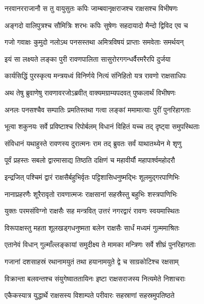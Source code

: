 
\twolineshloka
{नरवानरराजानौ स तु वायुसुतः कपिः}
{जाम्बवानृक्षराजश्च राक्षसश्च विभीषणः} %

\twolineshloka
{अङ्गदो वालिपुत्रश्च सौमित्रिः शरभः कपिः}
{सुषेणः सहदायादो मैन्दो द्विविद एव च} %

\twolineshloka
{गजो गवाक्षः कुमुदो नलोऽथ पनसस्तथा}
{अमित्रविषयं प्राप्ताः समवेताः समर्थयन्} %

\twolineshloka
{इयं सा लक्ष्यते लङ्का पुरी रावणपालिता}
{सासुरोरगगन्धर्वैरमरैरपि दुर्जया} %

\twolineshloka
{कार्यसिद्धिं पुरस्कृत्य मन्त्रयध्वं विनिर्णये}
{नित्यं संनिहितो यत्र रावणो राक्षसाधिपः} %

\twolineshloka
{अथ तेषु ब्रुवाणेषु रावणावरजोऽब्रवीत्}
{वाक्यमग्राम्यपदवत् पुष्कलार्थं विभीषणः} %

\twolineshloka
{अनलः पनसश्चैव सम्पातिः प्रमतिस्तथा}
{गत्वा लङ्कां ममामात्याः पुरीं पुनरिहागताः} %

\twolineshloka
{भूत्वा शकुनयः सर्वे प्रविष्टाश्च रिपोर्बलम्}
{विधानं विहितं यच्च तद् दृष्ट्वा समुपस्थिताः} %

\twolineshloka
{संविधानं यथाहुस्ते रावणस्य दुरात्मनः}
{राम तद् ब्रुवतः सर्वं याथातथ्येन मे शृणु} %

\twolineshloka
{पूर्वं प्रहस्तः सबलो द्वारमासाद्य तिष्ठति}
{दक्षिणं च महावीर्यौ महापार्श्वमहोदरौ} %

\twolineshloka
{इन्द्रजित् पश्चिमं द्वारं राक्षसैर्बहुभिर्वृतः}
{पट्टिशासिधनुष्मद्भिः शूलमुद्गरपाणिभिः} %

\twolineshloka
{नानाप्रहरणैः शूरैरावृतो रावणात्मजः}
{राक्षसानां सहस्रैस्तु बहुभिः शस्त्रपाणिभिः} %

\twolineshloka
{युक्तः परमसंविग्नो राक्षसैः सह मन्त्रवित्}
{उत्तरं नगरद्वारं रावणः स्वयमास्थितः} %

\twolineshloka
{विरूपाक्षस्तु महता शूलखड्गधनुष्मता}
{बलेन राक्षसैः सार्धं मध्यमं गुल्ममाश्रितः} %

\twolineshloka
{एतानेवं विधान् गुल्माँल्लङ्कायां समुदीक्ष्य ते}
{मामका मन्त्रिणः सर्वे शीघ्रं पुनरिहागताः} %

\twolineshloka
{गजानां दशसाहस्रं रथानामयुतं तथा}
{हयानामयुते द्वे च साग्रकोटिश्च रक्षसाम्} %

\twolineshloka
{विक्रान्ता बलवन्तश्च संयुगेष्वाततायिनः}
{इष्टा राक्षसराजस्य नित्यमेते निशाचराः} %

\twolineshloka
{एकैकस्यात्र युद्धार्थे राक्षसस्य विशाम्पते}
{परीवारः सहस्राणां सहस्रमुपतिष्ठते} %

